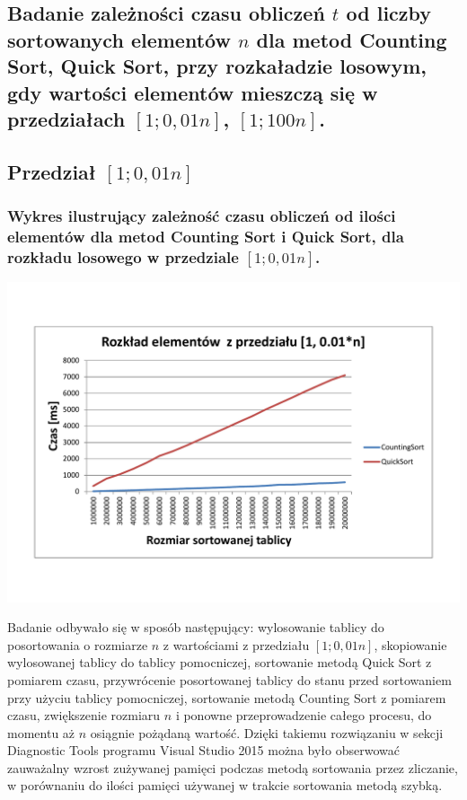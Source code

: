 \documentclass[polish,polish,a4paper]{article}
\begin{document}
\begin{spacing}{1.5}
\section{Badanie zależności czasu obliczeń $t$ od liczby sortowanych elementów $n$ dla metod Counting Sort, Quick Sort, przy rozkaładzie losowym, gdy wartości elementów mieszczą się w przedziałach  $ [1;0,01n] $, $ [1;100n] $. }

\subsection{Przedział $[1;0,01n]$}

\subsubsection*{Wykres ilustrujący zależność czasu obliczeń od ilości elementów dla metod Counting Sort i  Quick Sort, dla rozkładu losowego w przedziale $[1;0,01n]$.}
	
	\begin{minipage}[H]{\textwidth}
		\begin{center}
			\includegraphics[scale=0.6]{zad4001n.pdf}
			\label{fig:zad4001n}
		\end{center}
	\end{minipage}

Badanie odbywało się w sposób następujący: wylosowanie tablicy do posortowania o rozmiarze $n$ z wartościami z przedziału $[1;0,01n]$, skopiowanie wylosowanej tablicy do tablicy pomocniczej, sortowanie metodą Quick Sort z pomiarem czasu, przywrócenie posortowanej tablicy do stanu przed sortowaniem przy użyciu tablicy pomocniczej, sortowanie metodą Counting Sort z pomiarem czasu, zwiększenie rozmiaru $n$ i ponowne przeprowadzenie całego procesu, do momentu aż $n$ osiągnie pożądaną wartość.	Dzięki takiemu rozwiązaniu w sekcji Diagnostic Tools programu Visual Studio 2015 można było obserwować zauważalny  wzrost zużywanej pamięci podczas metodą sortowania przez zliczanie, w porównaniu do ilości pamięci używanej w trakcie sortowania metodą szybką.


\end{spacing}
\end{document}
